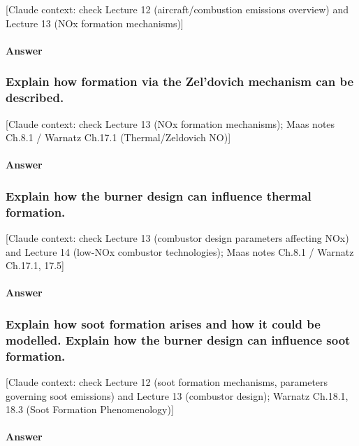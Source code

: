 {\color{gray}\footnotesize [Claude context: check Lecture 12 (aircraft/combustion emissions overview) and Lecture 13 (NOx formation mechanisms)]}

\paragraph{Answer}




\subsubsection{Explain how  formation via the Zel'dovich mechanism can be described.}

{\color{gray}\footnotesize [Claude context: check Lecture 13 (NOx formation mechanisms); Maas notes Ch.8.1 / Warnatz Ch.17.1 (Thermal/Zeldovich NO)]}

\paragraph{Answer}




\subsubsection{Explain how the burner design can influence thermal  formation.}

{\color{gray}\footnotesize [Claude context: check Lecture 13 (combustor design parameters affecting NOx) and Lecture 14 (low-NOx combustor technologies); Maas notes Ch.8.1 / Warnatz Ch.17.1, 17.5]}

\paragraph{Answer}




\subsubsection{Explain how soot formation arises and how it could be modelled. Explain how the burner design can influence soot formation.}

{\color{gray}\footnotesize [Claude context: check Lecture 12 (soot formation mechanisms, parameters governing soot emissions) and Lecture 13 (combustor design); Warnatz Ch.18.1, 18.3 (Soot Formation Phenomenology)]}

\paragraph{Answer}



